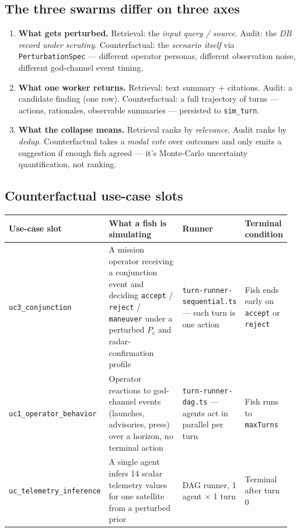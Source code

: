\subsection{The three swarms differ on three axes}

\begin{enumerate}[leftmargin=1.4em]
  \item \textbf{What gets perturbed.} Retrieval: the \emph{input query / source}. Audit: the \emph{DB record under scrutiny}. Counterfactual: the \emph{scenario itself} via \texttt{PerturbationSpec} --- different operator personas, different observation noise, different god-channel event timing.
  \item \textbf{What one worker returns.} Retrieval: text summary + citations. Audit: a candidate finding (one row). Counterfactual: a full trajectory of turns --- actions, rationales, observable summaries --- persisted to \texttt{sim\_turn}.
  \item \textbf{What the collapse means.} Retrieval ranks by \emph{relevance}. Audit ranks by \emph{dedup}. Counterfactual takes a \emph{modal vote} over outcomes and only emits a suggestion if enough fish agreed --- it's Monte-Carlo uncertainty quantification, not ranking.
\end{enumerate}

\subsection{Counterfactual use-case slots}

\begin{longtable}{@{}p{0.24\linewidth}p{0.42\linewidth}p{0.16\linewidth}p{0.14\linewidth}@{}}
\toprule
\textbf{Use-case slot} & \textbf{What a fish is simulating} & \textbf{Runner} & \textbf{Terminal condition} \\
\midrule
\endhead

\texttt{uc3\_conjunction} &
A mission operator receiving a conjunction event and deciding \texttt{accept} / \texttt{reject} / \texttt{maneuver} under a perturbed $P_c$ and radar-confirmation profile &
\texttt{turn-runner-sequential.ts} --- each turn is one action &
Fish ends early on \texttt{accept} or \texttt{reject} \\

\texttt{uc1\_operator\_behavior} &
Operator reactions to god-channel events (launches, advisories, press) over a horizon, no terminal action &
\texttt{turn-runner-dag.ts} --- agents act in parallel per turn &
Fish runs to \texttt{maxTurns} \\

\texttt{uc\_telemetry\_inference} &
A single agent infers 14 scalar telemetry values for one satellite from a perturbed prior &
DAG runner, 1 agent $\times$ 1 turn &
Terminal after turn 0 \\

\bottomrule
\end{longtable}

